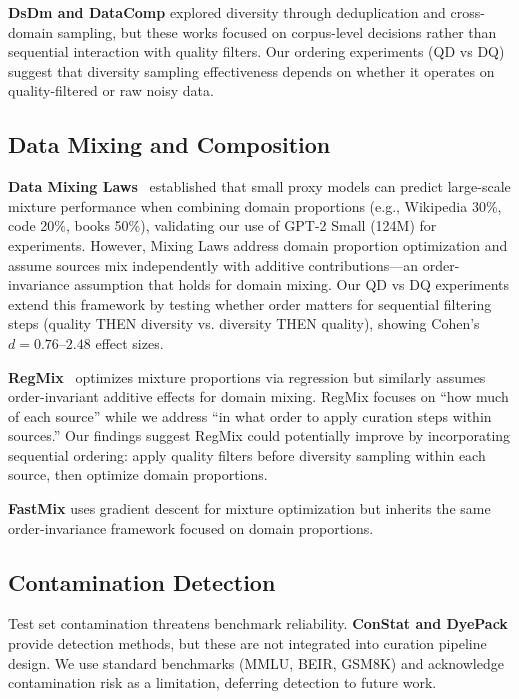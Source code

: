 \textbf{DsDm and DataComp} explored diversity through deduplication and cross-domain sampling, but these works focused on corpus-level decisions rather than sequential interaction with quality filters. Our ordering experiments (QD vs DQ) suggest that diversity sampling effectiveness depends on whether it operates on quality-filtered or raw noisy data.

\subsection{Data Mixing and Composition}

\textbf{Data Mixing Laws}~\cite{mixinglaws2024} established that small proxy models can predict large-scale mixture performance when combining domain proportions (e.g., Wikipedia 30\%, code 20\%, books 50\%), validating our use of GPT-2 Small (124M) for experiments. However, Mixing Laws address domain proportion optimization and assume sources mix independently with additive contributions---an order-invariance assumption that holds for domain mixing. Our QD vs DQ experiments extend this framework by testing whether order matters for sequential filtering steps (quality THEN diversity vs. diversity THEN quality), showing Cohen's $d=0.76$--$2.48$ effect sizes.

\textbf{RegMix}~\cite{regmix2024} optimizes mixture proportions via regression but similarly assumes order-invariant additive effects for domain mixing. RegMix focuses on ``how much of each source'' while we address ``in what order to apply curation steps within sources.'' Our findings suggest RegMix could potentially improve by incorporating sequential ordering: apply quality filters before diversity sampling within each source, then optimize domain proportions.

\textbf{FastMix} uses gradient descent for mixture optimization but inherits the same order-invariance framework focused on domain proportions.

\subsection{Contamination Detection}

Test set contamination threatens benchmark reliability. \textbf{ConStat and DyePack} provide detection methods, but these are not integrated into curation pipeline design. We use standard benchmarks (MMLU, BEIR, GSM8K) and acknowledge contamination risk as a limitation, deferring detection to future work.

